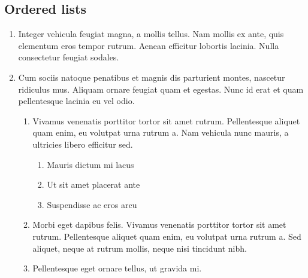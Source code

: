 \documentclass[letterpaper,10pt,english]{sphinxmanual}
\begin{document}
\subsection{Ordered lists}
\label{\detokenize{markdown:ordered-lists}}\begin{enumerate}
%
\item {} 
Integer vehicula feugiat magna, a mollis tellus. Nam mollis ex ante, quis
elementum eros tempor rutrum. Aenean efficitur lobortis lacinia. Nulla
consectetur feugiat sodales.

\item {} 
Cum sociis natoque penatibus et magnis dis parturient montes, nascetur
ridiculus mus. Aliquam ornare feugiat quam et egestas. Nunc id erat et quam
pellentesque lacinia eu vel odio.
\begin{enumerate}
%
\item {} 
Vivamus venenatis porttitor tortor sit amet rutrum. Pellentesque aliquet
quam enim, eu volutpat urna rutrum a. Nam vehicula nunc mauris, a
ultricies libero efficitur sed.
\begin{enumerate}
%
\item {} 
Mauris dictum mi lacus

\item {} 
Ut sit amet placerat ante

\item {} 
Suspendisse ac eros arcu

\end{enumerate}

\item {} 
Morbi eget dapibus felis. Vivamus venenatis porttitor tortor sit amet
rutrum. Pellentesque aliquet quam enim, eu volutpat urna rutrum a. Sed
aliquet, neque at rutrum mollis, neque nisi tincidunt nibh.

\item {} 
Pellentesque eget  ornare tellus, ut gravida mi.

\end{enumerate}

\begin{sphinxVerbatim}[commandchars=\\\{\}]
    
           
       \PYG{p}{[}\PYG{p}{]}
         
      \PYG{p}{[}\PYG{p}{]}  \PYG{p}{[}\PYG{p}{]}
   
\end{sphinxVerbatim}


\end{enumerate}
\end{document}
